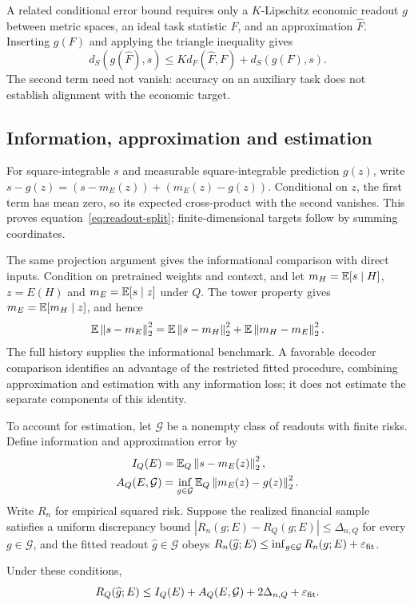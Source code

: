 \documentclass[11pt]{article}
\renewcommand{\lean}[1]{\ignorespaces}
\renewcommand{\leanok}{\ignorespaces}
\begin{document}
A related conditional error bound requires only a $K$-Lipschitz economic readout
$g$ between metric spaces, an ideal task statistic $F$, and an approximation
$\widehat F$. Inserting $g(F)$ and applying the triangle inequality gives
\begin{equation}\label{eq:measurement}
  d_S(g(\widehat F),s)
  \le Kd_F(\widehat F,F)+d_S(g(F),s).
\end{equation}
\lean{FreeFoundations.Measurement.measurement_error}\leanok{}
The second term need not vanish: accuracy on an auxiliary task does
not establish
alignment with the economic target.

\subsection{Information, approximation and estimation}
For square-integrable $s$ and measurable square-integrable prediction $g(z)$,
write $s-g(z)=(s-m_E(z))+(m_E(z)-g(z))$. Conditional on $z$, the first term has
mean zero, so its expected cross-product with the second vanishes. This proves
equation~\eqref{eq:readout-split}; finite-dimensional targets follow by summing
coordinates.
\lean{FreeFoundations.Recovery.excess_risk_condExp_vector}\leanok{}

The same projection argument gives the informational comparison with direct
inputs. Condition on pretrained weights and context, and let
$m_H=\mathbb{E}[s\mid H]$, $z=E(H)$ and $m_E=\mathbb{E}[s\mid z]$ under $Q$.
The tower property gives $m_E=\mathbb{E}[m_H\mid z]$, and hence
\[
  \mathbb{E}\left\lVert s-m_E\right\rVert_2^2
  =\mathbb{E}\left\lVert s-m_H\right\rVert_2^2+\mathbb{E}\left\lVert m_H-m_E\right\rVert_2^2.
\]
The full history supplies the informational benchmark. A favorable decoder
comparison identifies an advantage of the restricted fitted procedure,
combining approximation and estimation with any information loss; it does not
estimate the separate components of this identity.

To account for estimation, let $\mathcal G$ be a nonempty class of readouts with
finite risks. Define information and approximation error by
\begin{align*}
  I_Q(E)&=\mathbb E_Q\left\lVert s-m_E(z)\right\rVert_2^2,\\
  A_Q(E,\mathcal G)&=\inf_{g\in\mathcal G}
  \mathbb E_Q\left\lVert m_E(z)-g(z)\right\rVert_2^2.
\end{align*}
Write $R_n$ for empirical squared risk. Suppose the realized financial sample
satisfies a uniform discrepancy bound
$|R_n(g;E)-R_Q(g;E)|\le\Delta_{n,Q}$ for every $g\in\mathcal G$, and the fitted
readout $\widehat g\in\mathcal G$ obeys
$R_n(\widehat g;E)\le\inf_{g\in\mathcal G}R_n(g;E)+\varepsilon_{\rm fit}$.
\begin{proposition}\label{prop:calibrated-risk}
  \lean{FreeFoundations.Score.calibrated_measurement_bound}\leanok{}
  Under these conditions,
  \begin{equation}\label{eq:learning-measurement}
    R_Q(\widehat g;E)\le I_Q(E)+A_Q(E,\mathcal G)
    +2\Delta_{n,Q}+\varepsilon_{\rm fit}.
  \end{equation}
\end{proposition}
\end{document}
